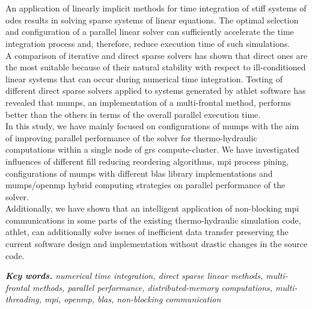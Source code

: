 \chapter{\abstractname}

An application of linearly implicit methods for time integration of stiff systems of \gls{ode}s  results in solving sparse systems of linear equations. The optimal selection and configuration of a parallel linear solver can sufficiently accelerate the time integration process and, therefore, reduce execution time of such simulations.\\



A comparison of iterative and direct sparse solvers has shown that direct ones are the most suitable because of their natural stability with respect to ill-conditioned linear systems that can occur during numerical time integration. Testing of different direct sparse solvers applied to systems generated by \gls{athlet} software has revealed that \gls{mumps}, an implementation of a multi-frontal method, performs better than the others in terms of the overall parallel execution time.\\


In this study, we have mainly focused on configurations of \gls{mumps} with the aim of improving parallel performance of the solver for thermo-hydraulic computations within a single node of \gls{grs} compute-cluster. We have investigated influences of  different fill reducing reordering algorithms, \gls{mpi} process pining, configurations of \gls{mumps} with different \gls{blas} library implementations and \gls{mumps}/\gls{openmp} hybrid computing strategies on parallel performance of the solver.\\


Additionally, we have shown that an intelligent application of non-blocking \gls{mpi} communications in some parts of the existing thermo-hydraulic simulation code, \gls{athlet}, can additionally solve issues of inefficient data transfer preserving the current software design and implementation without drastic changes in the source code.\\

\vspace{20mm}

\textit{\textbf{Key words.} numerical time integration, direct sparse linear methods, multi-frontal methods, parallel performance, distributed-memory computations,  multi-threading, \gls{mpi}, \gls{openmp}, \gls{blas}, non-blocking communication}